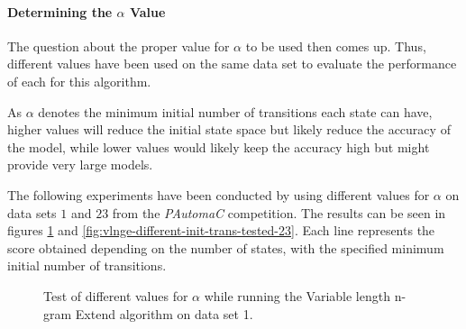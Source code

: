 \paragraph{Determining the $\alpha$ Value}

The question about the proper value for $\alpha$ to be used then comes up. Thus, different values have been used on the same data set to evaluate the performance of each for this algorithm.

As $\alpha$ denotes the minimum initial number of transitions each state can have, higher values will reduce the initial state space but likely reduce the accuracy of the model, while lower values would likely keep the accuracy high but might provide very large models.

The following experiments have been conducted by using different values for $\alpha$ on data sets $1$ and $23$ from the \emph{PAutomaC} competition. The results can be seen in figures \ref{fig:vlnge-different-init-trans-tested-1} and \ref{fig:vlnge-different-init-trans-tested-23}. Each line represents the score obtained depending on the number of states, with the specified minimum initial number of transitions.


\begin{figure}[!h]
\begin{centering}
\caption{Test of different values for $\alpha$ while running the Variable length n-gram Extend algorithm on data set 1.}
\label{fig:vlnge-different-init-trans-tested-1} 
\end{centering}
\end{figure}


